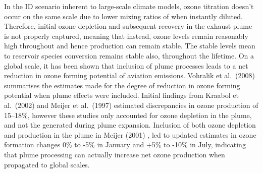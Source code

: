 In the ID scenario inherent to large-scale climate models, ozone titration doesn't occur on the same scale due to lower mixing ratios of  when instantly diluted. Therefore, initial ozone depletion and subsequent recovery in the exhaust plume is not properly captured, meaning that instead, ozone levels remain reasonably high throughout and hence  production can remain stable. The stable  levels mean  to reservoir species conversion remains stable also, throughout the  lifetime. On a global scale, it has been shown that inclusion of plume processes leads to a net reduction in ozone forming potential of aviation  emissions. Vohralik et al.\ (2008) \cite{Vohralik2008} summarises the estimates made for the degree of reduction in ozone forming potential when plume effects were included. Initial findings from Kraabol et al.\ (2002) \cite{Kraabol2002} and Meijer et al.\ (1997) \cite{Meijer1997} estimated discrepancies in ozone production of 15--18\%, however these studies only accounted for ozone depletion in the plume, and not the  generated during plume expansion. Inclusion of both ozone depletion and production in the plume in Meijer (2001) \cite{Meijer2001}, led to updated estimates in ozone formation changes 0\% to -5\% in January and +5\% to -10\% in July, indicating that plume processing can actually increase net ozone production when propagated to global scales. %



